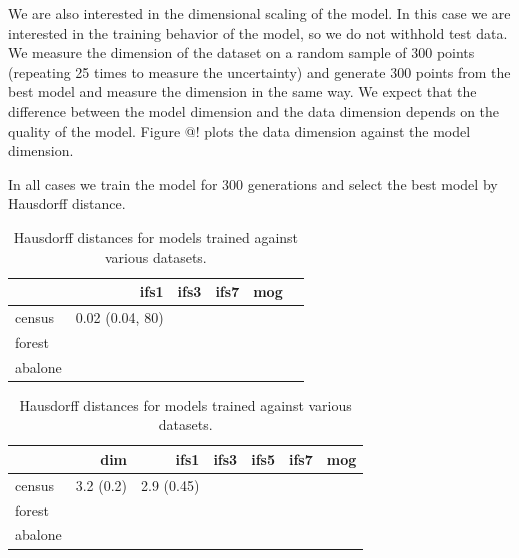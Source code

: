 \documentclass[10pt]{article}
\theoremstyle{definition}
\begin{document}
We are also interested in the dimensional scaling of the model. In this case we are interested in the training behavior of the model, so we do not withhold test data. We measure the dimension of the dataset on a random sample of 300 points (repeating 25 times to measure the uncertainty) and generate 300 points from the best model and measure the dimension in the same way. We expect that the difference between the model dimension and the data dimension depends on the quality of the model. Figure @! plots the data dimension against the model dimension. 


In all cases we train the model for 300 generations and select the best model by Hausdorff distance. 

\begin{table}
\begin{tabular}{l | r r r r | r |}
\hline
 & ifs1 & ifs3 & ifs7 & mog \\
\hline
census & 0.02 (0.04, 80) & & & & \\
forest & & & & & \\
abalone & & & & & \\
\hline

\end{tabular}
\caption{Hausdorff distances for models trained against various datasets.}
\label{tablelabel}
\end{table}

\begin{table}
\begin{tabular}{l | r r r r r | r |}
\hline
  & dim & ifs1 & ifs3 & ifs5 & ifs7 & mog \\
\hline
census & 3.2 (0.2) & 2.9 (0.45) & & & & \\
forest & & & & & & \\
abalone & & & & & & \\
\hline

\end{tabular}
\caption{Hausdorff distances for models trained against various datasets.}
\label{tablelabel}
\end{table}
\end{document}
